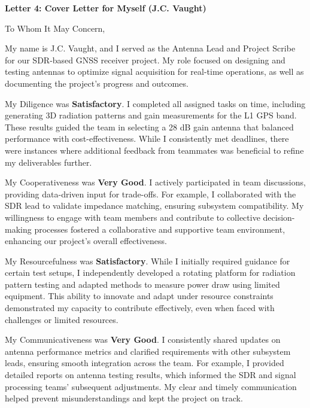 \documentclass[11pt]{article}
\begin{document}
\begin{flushleft}
\textbf{Letter 4: Cover Letter for Myself (J.C. Vaught)}

\vspace{12pt}

To Whom It May Concern,

\vspace{12pt}

My name is J.C. Vaught, and I served as the Antenna Lead and Project Scribe for our SDR-based GNSS receiver project. My role focused on designing and testing antennas to optimize signal acquisition for real-time operations, as well as documenting the project’s progress and outcomes.

My Diligence was \textbf{Satisfactory}. I completed all assigned tasks on time, including generating 3D radiation patterns and gain measurements for the L1 GPS band. These results guided the team in selecting a 28 dB gain antenna that balanced performance with cost-effectiveness. While I consistently met deadlines, there were instances where additional feedback from teammates was beneficial to refine my deliverables further.

My Cooperativeness was \textbf{Very Good}. I actively participated in team discussions, providing data-driven input for trade-offs. For example, I collaborated with the SDR lead to validate impedance matching, ensuring subsystem compatibility. My willingness to engage with team members and contribute to collective decision-making processes fostered a collaborative and supportive team environment, enhancing our project’s overall effectiveness.

My Resourcefulness was \textbf{Satisfactory}. While I initially required guidance for certain test setups, I independently developed a rotating platform for radiation pattern testing and adapted methods to measure power draw using limited equipment. This ability to innovate and adapt under resource constraints demonstrated my capacity to contribute effectively, even when faced with challenges or limited resources.

My Communicativeness was \textbf{Very Good}. I consistently shared updates on antenna performance metrics and clarified requirements with other subsystem leads, ensuring smooth integration across the team. For example, I provided detailed reports on antenna testing results, which informed the SDR and signal processing teams’ subsequent adjustments. My clear and timely communication helped prevent misunderstandings and kept the project on track.


\end{flushleft}
\end{document}
